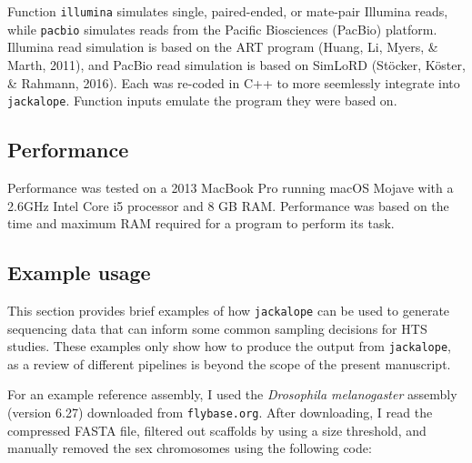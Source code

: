 \documentclass[12pt,]{article}
\newenvironment{Shaded}{\begin{snugshade}}{\end{snugshade}}
\newcommand{\DataTypeTok}[1]{\textcolor[rgb]{0.13,0.29,0.53}{#1}}
\newcommand{\FloatTok}[1]{\textcolor[rgb]{0.00,0.00,0.81}{#1}}
\newcommand{\KeywordTok}[1]{\textcolor[rgb]{0.13,0.29,0.53}{\textbf{#1}}}
\newcommand{\NormalTok}[1]{#1}
\newcommand{\OperatorTok}[1]{\textcolor[rgb]{0.81,0.36,0.00}{\textbf{#1}}}
\newcommand{\OtherTok}[1]{\textcolor[rgb]{0.56,0.35,0.01}{#1}}
\newcommand{\StringTok}[1]{\textcolor[rgb]{0.31,0.60,0.02}{#1}}
\begin{document}
Function \texttt{illumina} simulates single, paired-ended, or mate-pair Illumina reads,
while \texttt{pacbio} simulates reads from the Pacific Biosciences (PacBio) platform.
Illumina read simulation is based on the ART program
(Huang, Li, Myers, \& Marth, 2011), and
PacBio read simulation is based on SimLoRD (Stöcker, Köster, \& Rahmann, 2016).
Each was re-coded in C++ to more seemlessly integrate into \texttt{jackalope}.
Function inputs emulate the program they were based on.

\hypertarget{performance}{%
\subsection{Performance}\label{performance}}

Performance was tested on a 2013 MacBook Pro running macOS Mojave with a
2.6GHz Intel Core i5 processor and 8 GB RAM.
Performance was based on the time and maximum RAM required for a program
to perform its task.

\hypertarget{example-usage}{%
\subsection{Example usage}\label{example-usage}}

This section provides brief examples of how \texttt{jackalope} can be used
to generate sequencing data that can inform some common sampling decisions for HTS
studies.
These examples only show how to produce the output from \texttt{jackalope}, as
a review of different pipelines is beyond the scope of the present manuscript.

For an example reference assembly, I used the \emph{Drosophila melanogaster} assembly
(version 6.27) downloaded from \texttt{flybase.org}.
After downloading, I read the compressed FASTA file, filtered out
scaffolds by using a size threshold, and manually removed the sex chromosomes
using the following code:

\begin{Shaded}
\end{Shaded}
\end{document}

